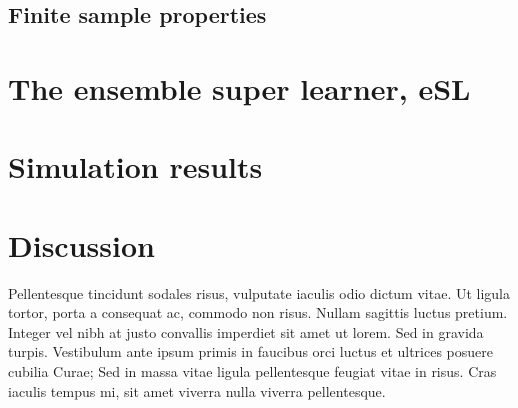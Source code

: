 \documentclass[11pt, a4paper]{article}
\theoremstyle{definition}
\theoremstyle{remark}
\begin{document}
\subsection{Finite sample properties}

\section{The ensemble super learner, eSL}
\section{Simulation results}
\section{Discussion}
Pellentesque tincidunt sodales risus, vulputate iaculis odio dictum vitae. Ut ligula tortor, porta a consequat ac, commodo non risus. Nullam sagittis luctus pretium. Integer vel nibh at justo convallis imperdiet sit amet ut lorem. Sed in gravida turpis. Vestibulum ante ipsum primis in faucibus orci luctus et ultrices posuere cubilia Curae; Sed in massa vitae ligula pellentesque feugiat vitae in risus. Cras iaculis tempus mi, sit amet viverra nulla viverra pellentesque.
\end{document}
